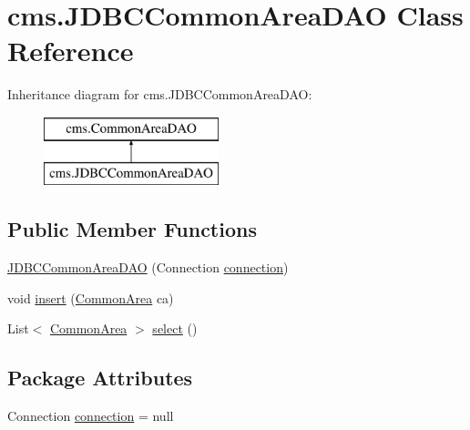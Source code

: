 \hypertarget{classcms_1_1_j_d_b_c_common_area_d_a_o}{}\section{cms.\+J\+D\+B\+C\+Common\+Area\+D\+AO Class Reference}
\label{classcms_1_1_j_d_b_c_common_area_d_a_o}
Inheritance diagram for cms.\+J\+D\+B\+C\+Common\+Area\+D\+AO\+:\begin{figure}[H]
\begin{center}
\leavevmode
\includegraphics[height=2.000000cm]{classcms_1_1_j_d_b_c_common_area_d_a_o}
\end{center}
\end{figure}
\subsection*{Public Member Functions}
\begin{DoxyCompactItemize}
\item 
\mbox{\hyperlink{classcms_1_1_j_d_b_c_common_area_d_a_o_ac16afa315389842ec5134d660d58421f}{J\+D\+B\+C\+Common\+Area\+D\+AO}} (Connection \mbox{\hyperlink{classcms_1_1_j_d_b_c_common_area_d_a_o_a9cd45620d4795fbf71bb1e4408e2100f}{connection}})
\item 
void \mbox{\hyperlink{classcms_1_1_j_d_b_c_common_area_d_a_o_a7b601071180c00446fbf2cc2235afb0b}{insert}} (\mbox{\hyperlink{classcms_1_1_common_area}{Common\+Area}} ca)
\item 
List$<$ \mbox{\hyperlink{classcms_1_1_common_area}{Common\+Area}} $>$ \mbox{\hyperlink{classcms_1_1_j_d_b_c_common_area_d_a_o_af23b754d7207a376a3b4995b333ccb40}{select}} ()
\end{DoxyCompactItemize}
\subsection*{Package Attributes}
\begin{DoxyCompactItemize}
\item 
Connection \mbox{\hyperlink{classcms_1_1_j_d_b_c_common_area_d_a_o_a9cd45620d4795fbf71bb1e4408e2100f}{connection}} = null
\end{DoxyCompactItemize}


